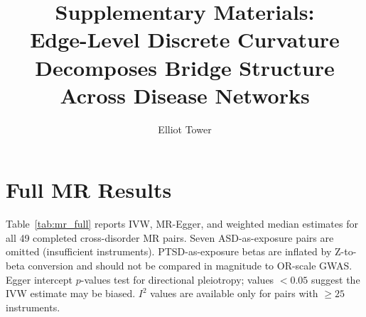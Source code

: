 \documentclass[11pt]{article}
\title{Supplementary Materials:\\Edge-Level Discrete Curvature Decomposes Bridge Structure Across Disease Networks}
\author{Elliot Tower}
\date{}
\begin{document}
\maketitle

\setcounter{section}{0}
\renewcommand{\thesection}{S\arabic{section}}
\renewcommand{\thetable}{S\arabic{table}}
\renewcommand{\thefigure}{S\arabic{figure}}

\section{Full MR Results}
\label{app:mr}

Table~\ref{tab:mr_full} reports IVW, MR-Egger, and weighted median estimates for all 49 completed cross-disorder MR pairs. Seven ASD-as-exposure pairs are omitted (insufficient instruments). PTSD-as-exposure betas are inflated by Z-to-beta conversion and should not be compared in magnitude to OR-scale GWAS. Egger intercept $p$-values test for directional pleiotropy; values $< 0.05$ suggest the IVW estimate may be biased. $I^2$ values are available only for pairs with $\geq 25$ instruments.
\end{document}
